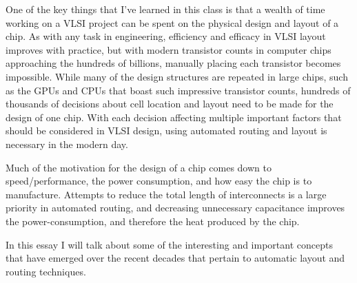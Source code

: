 
One of the key things that I've learned in this class
is that a wealth of time working on a VLSI project can
be spent on the physical design and layout of a chip.
As with any task in engineering, efficiency and efficacy
in VLSI layout improves with practice, but with modern
transistor counts in computer chips approaching the
hundreds of billions, manually placing each transistor
becomes impossible. While many of the design structures
are repeated in large chips, such as the GPUs and CPUs
that boast such impressive transistor counts, hundreds
of thousands of decisions about cell location and layout
need to be made for the design of one chip. With each
decision affecting multiple important factors that should
be considered in VLSI design, using automated routing
and layout is necessary in the modern day.

Much of the motivation for the design of a chip comes
down to speed/performance, the power consumption, and
how easy the chip is to manufacture. Attempts to reduce
the total length of interconnects is a large priority
in automated routing, and decreasing unnecessary capacitance
improves the power-consumption, and therefore the heat
produced by the chip.

In this essay I will talk about some of the interesting
and important concepts that have emerged over the recent decades
that pertain to automatic layout and routing techniques.
